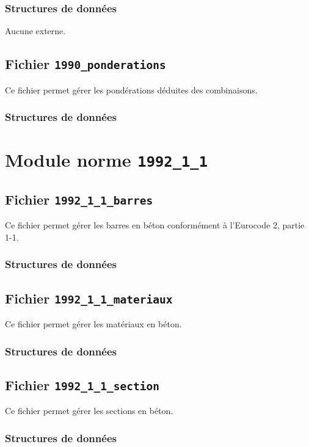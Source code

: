 \documentclass{article}
\begin{document}
\subsubsection{Structures de données}
Aucune externe.


\subsection{Fichier {\texttt{1990\_ponderations}}}
Ce fichier permet gérer les pondérations déduites des combinaisons.
\subsubsection{Structures de données}


\section{Module norme {\texttt{1992\_1\_1}}}
\subsection{Fichier {\texttt{1992\_1\_1\_barres}}}
Ce fichier permet gérer les barres en béton conformément à l'Eurocode 2, partie 1-1.
\subsubsection{Structures de données}


\subsection{Fichier {\texttt{1992\_1\_1\_materiaux}}}
Ce fichier permet gérer les matériaux en béton.
\subsubsection{Structures de données}


\subsection{Fichier {\texttt{1992\_1\_1\_section}}}
Ce fichier permet gérer les sections en béton.
\subsubsection{Structures de données}


\end{document}
